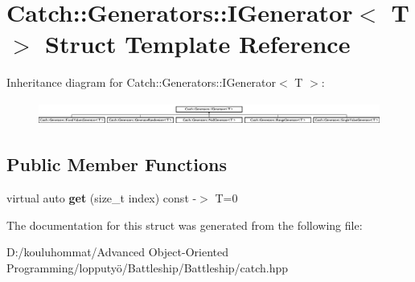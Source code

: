 \hypertarget{struct_catch_1_1_generators_1_1_i_generator}{}\section{Catch\+:\+:Generators\+:\+:I\+Generator$<$ T $>$ Struct Template Reference}
\label{struct_catch_1_1_generators_1_1_i_generator}
Inheritance diagram for Catch\+:\+:Generators\+:\+:I\+Generator$<$ T $>$\+:\begin{figure}[H]
\begin{center}
\leavevmode
\includegraphics[height=0.783217cm]{struct_catch_1_1_generators_1_1_i_generator}
\end{center}
\end{figure}
\subsection*{Public Member Functions}
\begin{DoxyCompactItemize}
\item 
\mbox{\label{struct_catch_1_1_generators_1_1_i_generator_a737a89eb0bff02e580e36c59fb0d1171}} 
virtual auto {\bfseries get} (size\+\_\+t index) const -\/$>$ T=0
\end{DoxyCompactItemize}


The documentation for this struct was generated from the following file\+:\begin{DoxyCompactItemize}
\item 
D\+:/kouluhommat/\+Advanced Object-\/\+Oriented Programming/lopputyö/\+Battleship/\+Battleship/catch.\+hpp\end{DoxyCompactItemize}
